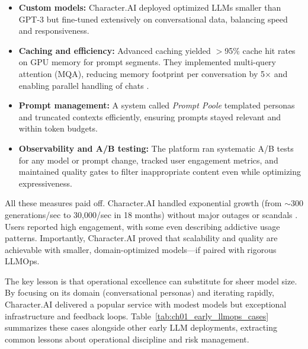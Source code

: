 \begin{itemize}
    \item \textbf{Custom models:} Character.AI deployed optimized LLMs smaller than GPT-3 but fine-tuned extensively on conversational data, balancing speed and responsiveness.  
    \item \textbf{Caching and efficiency:} Advanced caching yielded $>$95\% cache hit rates on GPU memory for prompt segments. They implemented multi-query attention (MQA), reducing memory footprint per conversation by 5$\times$ and enabling parallel handling of chats \parencite{zenml2023}.  
    \item \textbf{Prompt management:} A system called \emph{Prompt Poole} templated personas and truncated contexts efficiently, ensuring prompts stayed relevant and within token budgets.  
    \item \textbf{Observability and A/B testing:} The platform ran systematic A/B tests for any model or prompt change, tracked user engagement metrics, and maintained quality gates to filter inappropriate content even while optimizing expressiveness.  
\end{itemize}

All these measures paid off. Character.AI handled exponential growth (from $\sim$300 generations/sec to 30,000/sec in 18 months) without major outages or scandals \parencite{zenml2023}. Users reported high engagement, with some even describing addictive usage patterns. Importantly, Character.AI proved that scalability and quality are achievable with smaller, domain-optimized models---if paired with rigorous LLMOps.  

The key lesson is that operational excellence can substitute for sheer model size. By focusing on its domain (conversational personas) and iterating rapidly, Character.AI delivered a popular service with modest models but exceptional infrastructure and feedback loops. Table~\ref{tab:ch01_early_llmops_cases} summarizes these cases alongside other early LLM deployments, extracting common lessons about operational discipline and risk management.  





